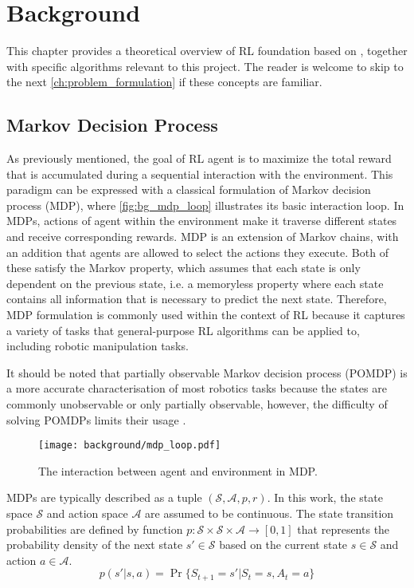 \chapter{Background}\label{ch:background}

This chapter provides a theoretical overview of RL foundation based on \citet{sutton_reinforcement_2018}, together with specific algorithms relevant to this project. The reader is welcome to skip to the next \autoref{ch:problem_formulation} if these concepts are familiar.


\section{Markov Decision Process}

As previously mentioned, the goal of RL agent is to maximize the total reward that is accumulated during a sequential interaction with the environment. This paradigm can be expressed with a classical formulation of Markov decision process (MDP), where \autoref{fig:bg_mdp_loop} illustrates its basic interaction loop. In MDPs, actions of agent within the environment make it traverse different states and receive corresponding rewards. MDP is an extension of Markov chains, with an addition that agents are allowed to select the actions they execute. Both of these satisfy the Markov property, which assumes that each state is only dependent on the previous state, i.e. a memoryless property where each state contains all information that is necessary to predict the next state. Therefore, MDP formulation is commonly used within the context of RL because it captures a variety of tasks that general-purpose RL algorithms can be applied to, including robotic manipulation tasks.

It should be noted that partially observable Markov decision process (POMDP) is a more accurate characterisation of most robotics tasks because the states are commonly unobservable or only partially observable, however, the difficulty of solving POMDPs limits their usage \cite{kroemer_review_2021}.

\begin{figure}[ht]
    \centering
    \texttt{[image: background/mdp\_loop.pdf]}
    \caption{The interaction between agent and environment in MDP.~\protect\cite{sutton_reinforcement_2018}}
    \label{fig:bg_mdp_loop}
\end{figure}

MDPs are typically described as a tuple \((\mathcal{S}, \mathcal{A}, p, r)\). In this work, the state space \(\mathcal{S}\) and action space \(\mathcal{A}\) are assumed to be continuous. The state transition probabilities are defined by function \(p : \mathcal{S} \times \mathcal{S} \times \mathcal{A} \rightarrow [0, 1]\) that represents the probability density of the next state \(s' \in \mathcal{S}\) based on the current state \(s \in \mathcal{S}\) and action \(a \in \mathcal{A}\).
\begin{equation}
    p(s' \vert s, a) = \Pr\{S_{t+1}{=}s' \vert S_t{=}s, A_{t}{=}a\}
\end{equation}

